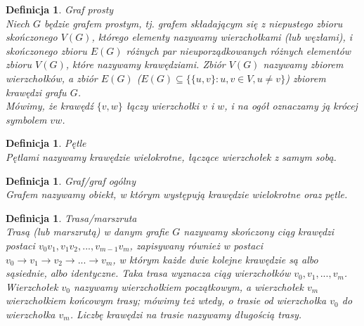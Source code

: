 \documentclass[12pt,a4paper]{report}
\newtheorem{definition}[theorem]{Definicja}
\begin{document}




\begin{definition}{Graf prosty \cite[Rozdział 2]{wilson2008}\\}
Niech $G$ będzie grafem prostym, tj. grafem składającym się z niepustego zbioru skończonego $V(G)$, którego elementy nazywamy wierzchołkami (lub węzłami), i skończonego zbioru $E(G)$ różnych par nieuporządkowanych różnych elementów zbioru $V(G)$, które nazywamy krawędziami. Zbiór $V(G)$ nazywamy zbiorem wierzchołków, a zbiór $E(G)$ ($E(G) \subseteq \{\{u,v\}: u,v \in V, u\neq v\}$) zbiorem krawędzi grafu $G$.\\
Mówimy, że krawędź $\{v,w\}$ łączy wierzchołki $v$ i $w$, i na ogół oznaczamy ją krócej symbolem $vw$.\\
\end{definition}

\begin{definition}{Pętle \cite[Rozdział 2]{wilson2008}\\}
Pętlami nazywamy krawędzie wielokrotne, łączące wierzchołek z samym sobą.\\
\end{definition}

\begin{definition}{Graf/graf ogólny \cite[Rozdział 2]{wilson2008}\\}
Grafem nazywamy obiekt, w którym występują krawędzie wielokrotne oraz pętle.\\
\end{definition}

\begin{definition}{Trasa/marszruta \cite[Rozdział 3]{wilson2008}\\}
Trasą (lub marszrutą) w danym grafie $G$ nazywamy skończony ciąg krawędzi postaci $v_{0}v_{1}, v_{1}v_{2}, ..., v_{m-1}v_{m}$, zapisywany również w postaci $v_{0} \rightarrow{} v_{1} \rightarrow{} v_{2} \rightarrow{} ... \rightarrow{} v_{m}$, w którym każde dwie kolejne krawędzie są albo sąsiednie, albo identyczne. Taka trasa wyznacza ciąg wierzchołków $v_{0}, v_{1}, ..., v_{m}$. Wierzchołek $v_{0}$ nazywamy wierzchołkiem początkowym, a wierzchołek $v_{m}$ wierzchołkiem końcowym trasy; mówimy też wtedy, o trasie od wierzchołka $v_{0}$ do wierzchołka $v_{m}$. Liczbę  krawędzi na trasie nazywamy długością trasy. \\
\end{definition}
\end{document}
